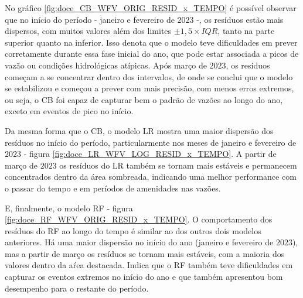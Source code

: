 %
%

No gráfico \ref{fig:doce_CB_WFV_ORIG_RESID_x_TEMPO} é possível observar que no início do período - janeiro e fevereiro de $2023$ -, os resíduos estão mais dispersos, com muitos valores além dos limites $\pm 1,5 \times IQR$, tanto na parte superior quanto na inferior. Isso denota que o modelo teve dificuldades em prever corretamente durante essa fase inicial do ano, que pode estar associada a picos de vazão ou condições hidrológicas atípicas. Após março de $2023$, os resíduos começam a se concentrar dentro dos intervalos, de onde se conclui que o modelo se estabilizou e começou a prever com mais precisão, com menos erros extremos, ou seja, o CB foi capaz de capturar bem o padrão de vazões ao longo do ano, exceto em eventos de pico no início.

Da mesma forma que o CB, o modelo LR mostra uma maior dispersão dos resíduos no início do período, particularmente nos meses de janeiro e fevereiro de $2023$ - figura \ref{fig:doce_LR_WFV_LOG_RESID_x_TEMPO}. A partir de março de $2023$ os resíduos do LR também se tornam mais estáveis e permanecem concentrados dentro da área sombreada, indicando uma melhor performance com o passar do tempo e em períodos de amenidades nas vazões.

E, finalmente, o modelo RF - figura \ref{fig:doce_RF_WFV_ORIG_RESID_x_TEMPO}. O comportamento dos resíduos do RF ao longo do tempo é similar ao dos outros dois modelos anteriores. Há uma maior dispersão no início do ano (janeiro e fevereiro de $2023$), mas a partir de março os resíduos se tornam mais estáveis, com a maioria dos valores dentro da aŕea destacada. Indica que o RF também teve dificuldades em capturar os eventos extremos no início do ano e que também apresentou bom desempenho para o restante do período.

